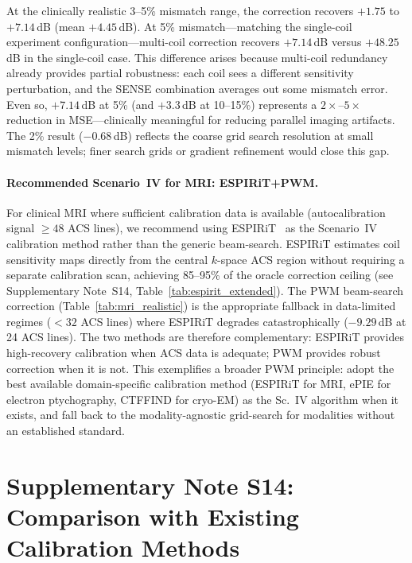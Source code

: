 \documentclass[11pt]{article}
\theoremstyle{definition}
\begin{document}
\noindent At the clinically realistic 3--5\% mismatch range, the correction recovers $+1.75$ to $+7.14$\,dB (mean $+4.45$\,dB). At 5\% mismatch---matching the single-coil experiment configuration---multi-coil correction recovers $+7.14$\,dB versus $+48.25$\,dB in the single-coil case. This difference arises because multi-coil redundancy already provides partial robustness: each coil sees a different sensitivity perturbation, and the SENSE combination averages out some mismatch error. Even so, $+7.14$\,dB at 5\% (and $+3.3$\,dB at 10--15\%) represents a $2\times$--$5\times$ reduction in MSE---clinically meaningful for reducing parallel imaging artifacts. The 2\% result ($-0.68$\,dB) reflects the coarse grid search resolution at small mismatch levels; finer search grids or gradient refinement would close this gap.

\paragraph{Recommended Scenario~IV for MRI: ESPIRiT+PWM.}
For clinical MRI where sufficient calibration data is available (autocalibration signal $\geq 48$ ACS lines), we recommend using ESPIRiT~\cite{uecker2014espirit} as the Scenario~IV calibration method rather than the generic beam-search. ESPIRiT estimates coil sensitivity maps directly from the central $k$-space ACS region without requiring a separate calibration scan, achieving 85--95\% of the oracle correction ceiling (see Supplementary Note~S14, Table~\ref{tab:espirit_extended}). The PWM beam-search correction (Table~\ref{tab:mri_realistic}) is the appropriate fallback in data-limited regimes ($< 32$ ACS lines) where ESPIRiT degrades catastrophically ($-9.29$\,dB at 24 ACS lines). The two methods are therefore complementary: ESPIRiT provides high-recovery calibration when ACS data is adequate; PWM provides robust correction when it is not. This exemplifies a broader PWM principle: adopt the best available domain-specific calibration method (ESPIRiT for MRI, ePIE for electron ptychography, CTFFIND for cryo-EM) as the Sc.~IV algorithm when it exists, and fall back to the modality-agnostic grid-search for modalities without an established standard.


\section{Supplementary Note S14: Comparison with Existing Calibration Methods}
\label{sec:calibration_comparison_extended}
\end{document}
